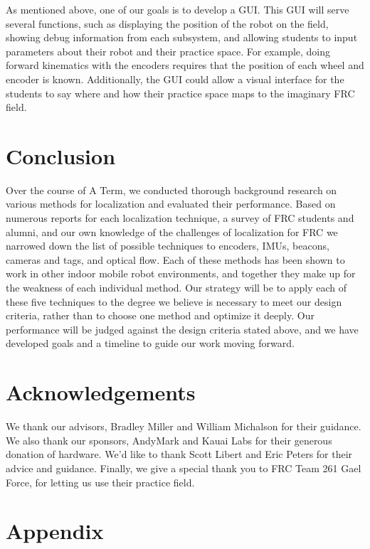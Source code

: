 \documentclass{article}
\begin{document}
      As mentioned above, one of our goals is to develop a GUI. This GUI will serve several functions, such as displaying the position of the robot on the field, showing debug information from each subsystem, and allowing students to input parameters about their robot and their practice space. For example, doing forward kinematics with the encoders requires that the position of each wheel and encoder is known. Additionally, the GUI could allow a visual interface for the students to say where and how their practice space maps to the imaginary FRC field.

\section{Conclusion} \label{conclusion}

  Over the course of A Term, we conducted thorough background research on various methods for localization and evaluated their performance. Based on numerous reports for each localization technique, a survey of FRC students and alumni, and our own knowledge of the challenges of localization for FRC we narrowed down the list of possible techniques to encoders, IMUs, beacons, cameras and tags, and optical flow. Each of these methods has been shown to work in other indoor mobile robot environments, and together they make up for the weakness of each individual method. Our strategy will be to apply each of these five techniques to the degree we believe is necessary to meet our design criteria, rather than to choose one method and optimize it deeply. Our performance will be judged against the design criteria stated above, and we have developed goals and a timeline to guide our work moving forward.

\section{Acknowledgements}

  We thank our advisors, Bradley Miller and William Michalson for their guidance. We also thank our sponsors, AndyMark and Kauai Labs for their generous donation of hardware. We'd like to thank Scott Libert and Eric Peters for their advice and guidance. Finally, we give a special thank you to FRC Team 261 Gael Force, for letting us use their practice field.

\section{Appendix}
\end{document}
